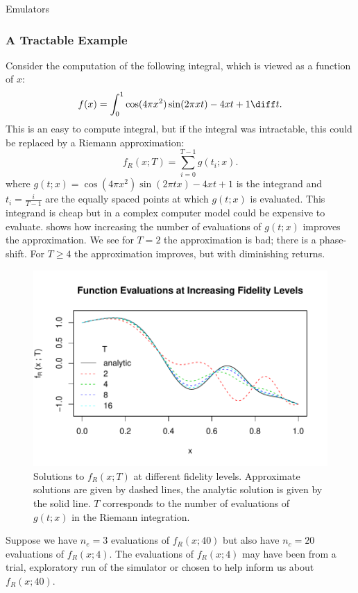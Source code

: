 \begin{chapter}{Emulators \label{Ch:Emulators}}
\subsubsection{A Tractable Example}
Consider the computation of the following integral, which is viewed as a function of $x$:
\begin{equation}
  f(x) = \int_0^1 \cos(4 \pi x^2)\sin(2 \pi xt) - 4xt + 1 \diff t.
\end{equation}
This is an easy to compute integral, but if the integral was intractable, this could be replaced by a Riemann approximation:
\begin{equation}
  f_R(x; T) = \sum_{i = 0}^{T-1} g(t_i ; x).
\end{equation}
where $g(t ; x) = \cos(4 \pi x^2)\sin(2 \pi t x) - 4xt + 1$ is the integrand and $t_i = \tfrac{i}{T-1}$ are the equally spaced points at which $g(t;x)$ is evaluated. This integrand is cheap but in a complex computer model could be expensive to evaluate.  shows how increasing the number of evaluations of $g(t;x)$ improves the approximation. We see for $T=2$ the approximation is bad; there is a phase-shift. For $T \geq 4$ the approximation improves, but with diminishing returns.
\begin{figure}[h]
  \centering
  \includegraphics{fig-emulators/fidelity.pdf}
  \caption{Solutions to $f_R(x;T)$ at different fidelity levels. Approximate solutions are given by dashed lines, the analytic solution is given by the solid line. $T$ corresponds to the number of evaluations of $g(t;x)$ in the Riemann integration.}
  \label{Fig:fidelity}
\end{figure}
Suppose we have $n_e = 3$ evaluations of $f_R(x; 40)$ but also have $n_c = 20$ evaluations of $f_R(x;4)$. The evaluations of $f_R(x;4)$ may have been from a trial, exploratory run of the simulator or chosen to help inform us about $f_R(x; 40)$.

\end{chapter}
